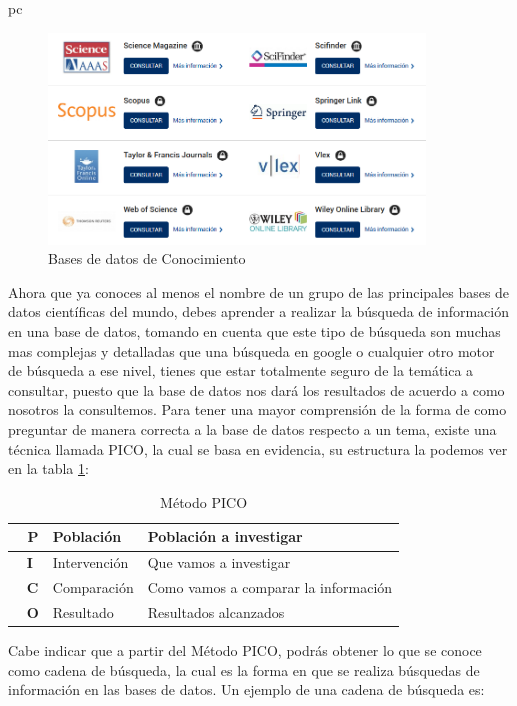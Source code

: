 pc\documentclass[a4paper,12pt,openany]{book}
\begin{document}
\begin{itemize}
        \begin{figure}[H]
        \centering
    	\includegraphics[width=10cm]{basesdedatos4.png}
        \caption{Bases de datos de Conocimiento}
        \label{fig:basededatos4}
        \end{figure}


Ahora que ya conoces al menos el nombre de un grupo de las principales bases de datos científicas del mundo, debes aprender a realizar la búsqueda de información en una base de datos, tomando en cuenta que este tipo de búsqueda son muchas mas complejas y detalladas que una búsqueda en google o cualquier otro motor de búsqueda a ese nivel, tienes que estar totalmente seguro de la temática a consultar, puesto que la base de datos nos dará los resultados de acuerdo a como nosotros la consultemos. Para tener una mayor comprensión de la forma de como preguntar de manera correcta a la base de datos respecto a un tema, existe una técnica llamada PICO, la cual se basa en evidencia, su estructura la podemos ver en la tabla \ref{tbl:pico}:

\begin{table}[H]
\centering
\footnotesize
\begin{tabular}{|l|l|l|}
\hline
$\enspace$ \textbf{P} & Población & Población a investigar \\  
\hline
$\enspace$ \textbf{I} & Intervención & Que vamos a investigar \\  
\hline
$\enspace$ \textbf{C} & Comparación & Como vamos a comparar la información \\  
\hline
$\enspace$ \textbf{O} & Resultado & Resultados alcanzados\\  
\hline
\end{tabular}
\caption{Método PICO}
\label{tbl:pico}
\end{table} 

Cabe indicar que a partir del Método PICO, podrás obtener lo que se conoce como cadena de búsqueda, la cual es la forma en que se realiza búsquedas de información en las bases de datos. Un ejemplo de una cadena de búsqueda es:


\end{itemize}
\end{document}
